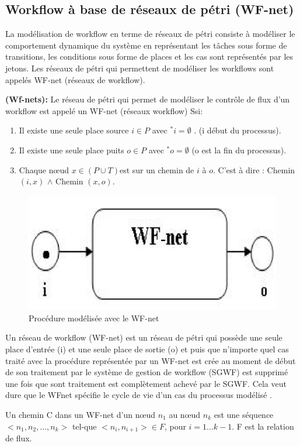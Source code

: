 \subsection{Workflow à base de réseaux de pétri (WF-net) }
La modélisation de workflow en terme de réseaux de pétri consiste à modéliser le comportement dynamique du système en représentant les tâches sous forme de transitions, les conditions sous forme de places et les cas sont représentés par les jetons. Les réseaux de pétri qui permettent de modéliser les workflows sont appelés WF-net (réseaux de workflow).

\begin{defn}
\textbf{(Wf-nets):}  Le réseau de pétri qui permet de modéliser le contrôle de flux d’un workflow est appelé un WF-net  (réseaux workflow) Ssi:

\begin{enumerate}
\item Il existe une seule place source $i \in P$ avec $ ^{*}i = \emptyset $ . (i début du processus).

\item  Il existe une seule place puits $o \in P$ avec $ ^{*}o = \emptyset $  (o est la fin du processus).

\item  Chaque nœud $x \in (P \cup T) $est sur un chemin de $i$ à $o$. C’est à dire : Chemin $(i, x)$ $\wedge$ Chemin $(x, o)$.



\end{enumerate} 

\begin{figure}[H]
	\centering
	\includegraphics[width=0.5\linewidth]{images/wf-nete006}
	\caption{ Procédure modélisée avec le WF-net }
	\label{fig:wf-nete006}
\end{figure}

\end{defn}
Un réseau de workflow (WF-net) est un réseau de pétri qui possède une seule place d’entrée (i) et une seule place de sortie (o) et puis que n’importe quel cas traité avec la procédure représentée par un WF-net est crée au moment de début de son traitement par le système de gestion de workflow (SGWF) est supprimé une fois que sont traitement est complètement achevé par le SGWF. Cela veut dure que le WFnet spécifie le cycle de vie d’un cas du processus modélisé  .
\begin{rem}
  Un chemin C dans un WF-net d’un nœud $n_{1}$ au nœud $n_{k}$ est une séquence $<n_{1},n_{2},...,n_{k}>$ tel-que $<n_{i},n_{i+1}> \in F $, pour $i=1...k-1$.
  F est la relation de flux. 
\end{rem}

